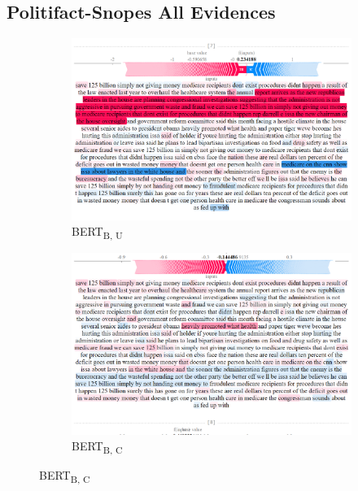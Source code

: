 \clearpage
\subsection{Politifact-Snopes All Evidences}
\label{fig:shap-ps-all-annex}

\begin{figure}[!h]
    \captionsetup[subfigure]{justification=Centering}
    \begin{subfigure}[t]{0.4\textwidth}
        \includegraphics[width=\textwidth]{figs/all_F/bert-b-u.png}
        \caption{{BERT}\textsubscript{B, U}}
    \end{subfigure}
    \hspace{\fill} %
    \begin{subfigure}[t]{0.4\textwidth}
        \includegraphics[width=\linewidth]{figs/all_F/bert-b-c.png}
        \caption{{BERT}\textsubscript{B, C}}
    \end{subfigure}



\end{figure}
